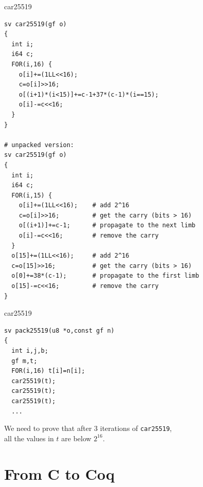 \documentclass[8pt]{beamer}
\begin{document}
%
%
\begin{frame}[fragile]{car25519}
  \begin{center}

\begin{lstlisting}[language=cnacl, caption=car25519, label=cod:languageC51]
sv car25519(gf o)
{
  int i;
  i64 c;
  FOR(i,16) {
    o[i]+=(1LL<<16);
    c=o[i]>>16;
    o[(i+1)*(i<15)]+=c-1+37*(c-1)*(i==15);
    o[i]-=c<<16;
  }
}

# unpacked version:
sv car25519(gf o)
{
  int i;
  i64 c;
  FOR(i,15) {
    o[i]+=(1LL<<16);    # add 2^16
    c=o[i]>>16;         # get the carry (bits > 16)
    o[(i+1)]+=c-1;      # propagate to the next limb
    o[i]-=c<<16;        # remove the carry
  }
  o[15]+=(1LL<<16);     # add 2^16
  c=o[15]>>16;          # get the carry (bits > 16)
  o[0]+=38*(c-1);       # propagate to the first limb
  o[15]-=c<<16;         # remove the carry
}
\end{lstlisting}

  \end{center}
\end{frame}

%
%

\begin{frame}[fragile]{car25519}
  \begin{center}
\begin{lstlisting}[language=cnacl, caption=car25519 in use, label=cod:languageC61]
sv pack25519(u8 *o,const gf n)
{
  int i,j,b;
  gf m,t;
  FOR(i,16) t[i]=n[i];
  car25519(t);
  car25519(t);
  car25519(t);
  ...
\end{lstlisting}

    We need to prove that after $3$ iterations of {\color[rgb]{0.5,0,0.5}\texttt{car25519}},\\
    \Large\alert{all the values in $t$ are below $2^{16}$}.

  \end{center}
\end{frame}

\section{From C to Coq}

%
%
\end{document}
